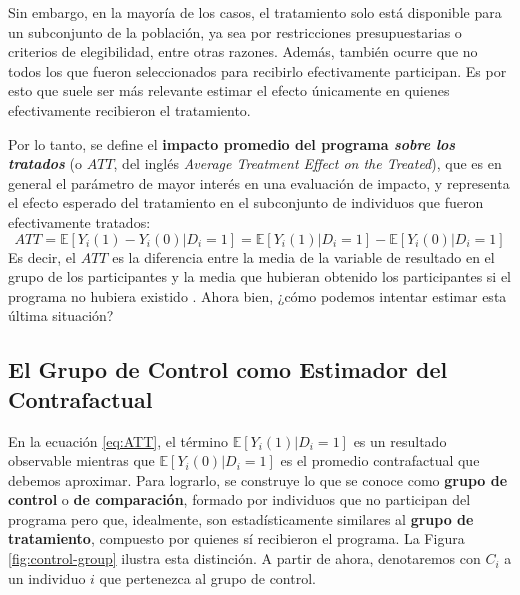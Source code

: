 \documentclass[../../main.tex]{subfiles}
\begin{document}
Sin embargo, en la mayoría de los casos, el tratamiento solo está disponible para un
subconjunto de la población, ya sea por restricciones presupuestarias o criterios de
elegibilidad, entre otras razones. Además, también ocurre que no todos los que fueron
seleccionados para recibirlo efectivamente participan. Es por esto que suele ser más
relevante estimar el efecto únicamente en quienes efectivamente recibieron el tratamiento.

Por lo tanto, se define el \textbf{impacto promedio del programa \textit{sobre los
tratados}} (o \(ATT\), del inglés \textit{Average Treatment Effect on the Treated}), que
es en general el parámetro de mayor interés en una evaluación de impacto, y representa el
efecto esperado del tratamiento en el subconjunto de individuos que fueron efectivamente
tratados:
\begin{equation}
    ATT = \mathbb{E} \left[Y_i(1)-Y_i(0)|D_i=1\right] = \mathbb{E} \left[Y_i(1)|D_i=1\right] -
    \mathbb{E} \left[Y_i(0)|D_i=1\right]
    \label{eq:ATT}
\end{equation}
Es decir, el \(ATT\) es la diferencia entre la media de la variable de resultado en el
grupo de los participantes y la media que hubieran obtenido los participantes si el
programa no hubiera existido \cite{bernal}. Ahora bien, ¿cómo podemos intentar estimar
esta última situación?

\subsection{El Grupo de Control como Estimador del Contrafactual}
En la ecuación \ref{eq:ATT}, el término \(\mathbb{E} \left[Y_i(1)|D_i=1\right]\) es un
resultado observable mientras que \(\mathbb{E} \left[Y_i(0)|D_i=1\right]\) es el promedio
contrafactual que debemos aproximar. Para lograrlo, se construye lo que se conoce como
\textbf{grupo de control} o \textbf{de comparación}, formado por individuos que no
participan del programa pero que, idealmente, son estadísticamente similares
\cite{gertler-2016} al \textbf{grupo de tratamiento}, compuesto por quienes sí recibieron
el programa. La Figura \ref{fig:control-group} ilustra esta distinción. A partir de ahora,
denotaremos con \(C_i\) a un individuo \(i\) que pertenezca al grupo de control.
\end{document}
